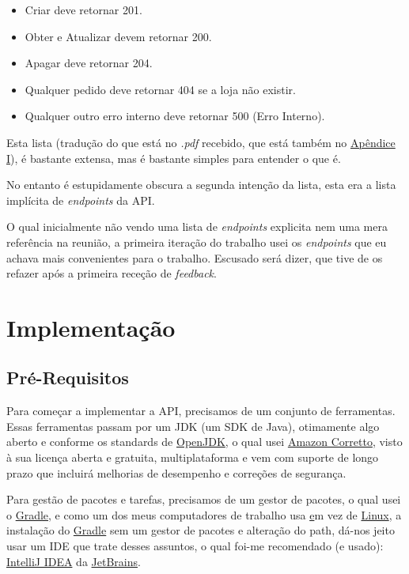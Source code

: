 \begin{itemize}
  \item Criar deve retornar 201.
  \item Obter e Atualizar devem retornar 200.
  \item Apagar deve retornar 204.
  \item Qualquer pedido deve retornar 404 se a loja não existir.
  \item Qualquer outro erro interno deve retornar 500 (Erro Interno).
\end{itemize}

Esta lista (tradução do que está no \textit{.pdf} recebido, que está também no \hyperref[ap1]{Apêndice I}), é bastante extensa, mas é bastante simples para entender o que é.

No entanto é estupidamente obscura a segunda intenção da lista, esta era a lista implícita de \textit{endpoints} da API\@.

O qual inicialmente não vendo uma lista de \textit{endpoints} explicita nem uma mera referência na reunião, a primeira iteração do trabalho usei os \textit{endpoints} que eu achava mais convenientes para o trabalho. Escusado será dizer, que tive de os refazer após a primeira receção de \textit{feedback}.

\newpage

\section{Implementação}

\subsection{Pré-Requisitos}

Para começar a implementar a API, precisamos de um conjunto de ferramentas. Essas ferramentas passam por um JDK (um SDK de Java), otimamente algo aberto e conforme os standards de \href{https://openjdk.org/}{OpenJDK}, o qual usei \href{https://docs.aws.amazon.com/corretto/latest/corretto-17-ug/downloads-list.html}{Amazon Corretto}, visto à sua licença aberta e gratuita, multiplataforma e vem com suporte de longo prazo que incluirá melhorias de desempenho e correções de segurança.

Para gestão de pacotes e tarefas, precisamos de um gestor de pacotes, o qual usei o \href{https://gradle.org/}{Gradle}, e como um dos meus computadores de trabalho usa \href{https://www.microsoft.com/pt-pt/software-download/windows10} em vez de \href{https://archlinux.org/download/}{Linux}, a instalação do \href{https://gradle.org/}{Gradle} sem um gestor de pacotes e alteração do path, dá-nos jeito usar um IDE que trate desses assuntos, o qual foi-me recomendado (e usado): \href{https://www.jetbrains.com/idea/}{IntelliJ IDEA} da \href{https://www.jetbrains.com/}{JetBrains}.

